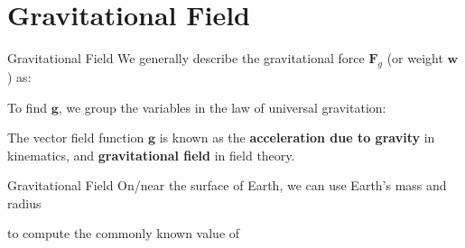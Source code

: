 \documentclass[12pt,compress,aspectratio=169]{beamer}
\begin{document}
\section{Gravitational Field}

\begin{frame}{Gravitational Field}
  We generally describe the gravitational force $\bm{F}_g$ (or weight $\bm{w}$)
  as:
  

  To find $\bm{g}$, we group the variables in the law of universal gravitation:
    

  The vector field function $\bm{g}$ is known as the
  \textbf{acceleration due to gravity} in kinematics, and
  \textbf{gravitational field} in field theory.
\end{frame}



\begin{frame}{Gravitational Field}
  On/near the surface of Earth, we can use Earth's mass and radius

  
  \vspace{-.2in}to compute the commonly known value of

\end{frame}
\end{document}
